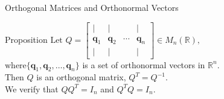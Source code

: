 \documentclass[aspectratio=169]{beamer}
\begin{document}
    \begin{frame}{Orthogonal Matrices and Orthonormal Vectors}
        \begin{block}{Proposition}
            $\text{Let } Q = \begin{bmatrix} | & | & & | \\ \mathbf{q}_1 & \mathbf{q}_2 & \cdots & \mathbf{q}_n \\ | & | & & | \end{bmatrix} \in M_n(\mathbb{R}),$\\
    $\text{where} \{\mathbf{q}_1, \mathbf{q}_2, \dots, \mathbf{q}_n \}$ is a set of orthonormal vectors in $\mathbb{R}^n.$\\
    $\text{Then } Q$ is an orthogonal matrix, $Q^T = Q^{-1}$.\\
    We verify that $QQ^T = I_n$ and $Q^T Q = I_n$.
        \end{block}
    \end{frame}
    
\end{document}
